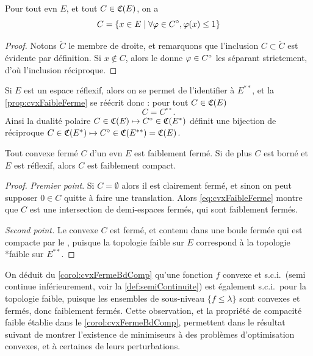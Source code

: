 \begin{proposition}
\label{prop:cvxFaibleFerme}
%
Pour tout evn $E$, et tout $C \in \mathfrak{C}(E)$, on a 
\begin{equation}
\label{eq:cvxFaibleFerme}
	C = \{x \in E \mid \forall \varphi \in C^\circ, \varphi(x) \leq 1\} 
\end{equation}
\end{proposition}

\begin{proof}
Notons $\tilde C$ le membre de droite, et remarquons que l'inclusion $C \subset \tilde C$ est évidente par définition. Si $x\notin C$, alors le  donne $\varphi \in C^\circ$ les séparant strictement, d'où l'inclusion réciproque.
\end{proof}


Si $E$ est un espace réflexif, alors on se permet de l'identifier à $E^{**}$, et la \cref{prop:cvxFaibleFerme} se réécrit donc : pour tout $C \in \mathfrak{C}(E)$
\begin{equation*}
	C = C^{\circ\circ}.
\end{equation*}
Ainsi la dualité polaire $C \in \mathfrak{C}(E) \mapsto C^\circ \in \mathfrak{C}(E^*)$ définit une bijection de réciproque $C \in \mathfrak{C}(E^*) \mapsto C^\circ \in \mathfrak{C}(E^{**}) = \mathfrak{C}(E)$.


\begin{corollary} %
\label{corol:cvxFermeBdComp}
%
Tout convexe fermé $C$ d'un evn $E$ est faiblement fermé.
Si de plus $C$ est borné et $E$ est réflexif, alors $C$ est faiblement compact.
\end{corollary}

\begin{proof}
\emph{Premier point}. Si $C=\emptyset$ alors il est clairement fermé, et sinon on peut supposer $0 \in C$ quitte à faire une translation. Alors \eqref{eq:cvxFaibleFerme} montre que $C$ est une intersection de demi-espaces fermés, qui sont faiblement fermés.


\emph{Second point.} Le convexe $C$ est fermé, et contenu dans une boule fermée qui est compacte par le , puisque la topologie faible sur $E$ correspond à la topologie *faible sur $E^{**}$.
\end{proof}

On déduit du \cref{corol:cvxFermeBdComp} qu'une fonction $f$ convexe et s.c.i.\ (semi continue inférieurement, voir la \cref{def:semiContinuite}) est également s.c.i.\ pour la topologie faible, puisque les ensembles de sous-niveau $\{f \leq \lambda\}$ sont convexes et fermés, donc faiblement fermés. 
Cette observation, et la propriété de compacité faible établie dans le \cref{corol:cvxFermeBdComp}, permettent dans le résultat suivant de montrer l'existence de minimiseurs à des problèmes d'optimisation convexes, et à certaines de leurs perturbations. 

